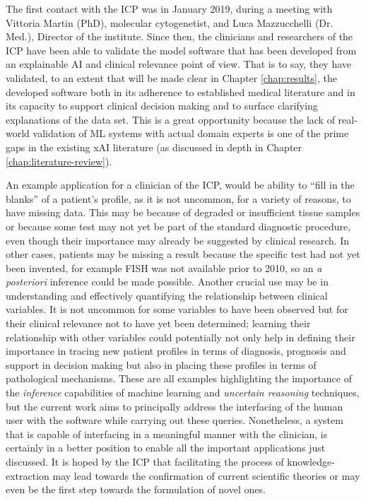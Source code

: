 The first contact with the ICP was in January 2019, during a meeting with Vittoria Martin (PhD), molecular cytogenetist, and Luca Mazzucchelli (Dr. Med.), Director of the institute.
Since then, the clinicians and researchers of the ICP have been able to validate the model software that has been developed from an explainable AI and clinical relevance point of view.
That is to say, they have validated, to an extent that will be made clear in Chapter \ref{chap:results}, the developed software both in its adherence to established medical literature and in its capacity to support clinical decision making and to surface clarifying explanations of the data set.
This is a great opportunity because the lack of real-world validation of ML systems with actual domain experts is one of the prime gaps in the existing xAI literature (as discussed in depth in Chapter \ref{chap:literature-review}).

An example application for a clinician of the ICP, would be ability to \enquote{fill in the blanks} of a patient's profile, as it is not uncommon, for a variety of reasons, to have missing data.
This may be because of degraded or insufficient tissue samples or because some test may not yet be part of the standard diagnostic procedure, even though their importance may already be suggested by clinical research.
In other cases, patients may be missing a result because the specific test had not yet been invented, for example FISH was not available prior to 2010, so an \textit{a posteriori} inference could be made possible.
Another crucial use may be in understanding and effectively quantifying the relationship between clinical variables.
It is not uncommon for some variables to have been observed but for their clinical relevance not to have yet been determined; learning their relationship with other variables could potentially not only help in defining their importance in tracing new patient profiles in terms of diagnosis, prognosis and support in decision making but also in placing these profiles in terms of pathological mechanisms.
These are all examples highlighting the importance of the \textit{inference} capabilities of machine learning and \textit{uncertain reasoning} techniques, but the current work aims to principally address the interfacing of the human user with the software while carrying out these queries.
Nonetheless, a system that is capable of interfacing in a meaningful manner with the clinician, is certainly in a better position to enable all the important applications just discussed.
It is hoped by the ICP that facilitating the process of knowledge-extraction may lead towards the confirmation of current scientific theories or may even be the first step towards the formulation of novel ones.

